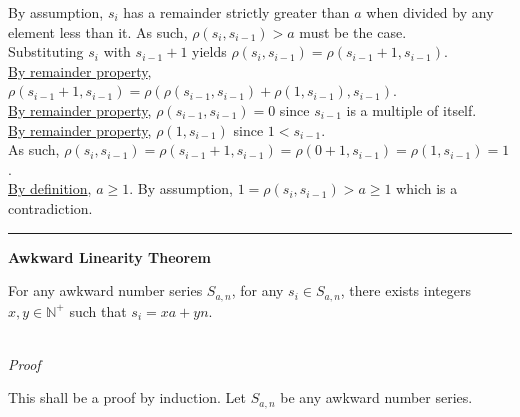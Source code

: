 \documentclass[a4paper,12pt]{article}
\begin{document}
\noindent By assumption, $s_i$ has a remainder strictly greater than $a$ when divided by any element less than it. As such, $\rho(s_i, s_{i - 1}) > a$ must be the case.\\

\noindent Substituting $s_i$ with $s_{i - 1} + 1$ yields $\rho(s_i, s_{i - 1}) = \rho(s_{i - 1} + 1, s_{i - 1})$.\\

\noindent \hyperlink{remainder_properties}{By remainder property}, $\rho(s_{i - 1} + 1, s_{i - 1}) = \rho(\rho(s_{i - 1}, s_{i - 1}) + \rho(1, s_{i - 1}), s_{i - 1})$.\\

\noindent \hyperlink{remainder_properties}{By remainder property}, $\rho(s_{i - 1}, s_{i - 1}) = 0$ since $s_{i - 1}$ is a multiple of itself.\\

\noindent \hyperlink{remainder_properties}{By remainder property}, $\rho(1, s_{i - 1})$ since $1 < s_{i - 1}$.\\

\noindent As such, $\rho(s_i, s_{i - 1}) = \rho(s_{i - 1} + 1, s_{i - 1}) = \rho(0 + 1, s_{i - 1}) = \rho(1, s_{i - 1}) = 1$.\\

\noindent \hyperlink{definition:awkward_number_series}{By definition}, $a \geq 1$. By assumption, $1 = \rho(s_i, s_{i - 1}) > a \geq 1$ which is a contradiction.


\begin{center}
\noindent\rule{8cm}{0.4pt}
\end{center}









\label{theorem:awkward_linearity}
\hypertarget{theorem:awkward_linearity}{}
\begin{tcolorbox}
\textbf{Awkward Linearity Theorem}

For any awkward number series $S_{a,n}$, for any $s_i \in S_{a,n}$, there exists integers $x, y \in \mathbb{N}^+$ such that $s_i = xa + yn$.

\end{tcolorbox}

\noindent \\
\textit{Proof}

\noindent This shall be a proof by induction. Let $S_{a,n}$ be any awkward number series.
\end{document}
